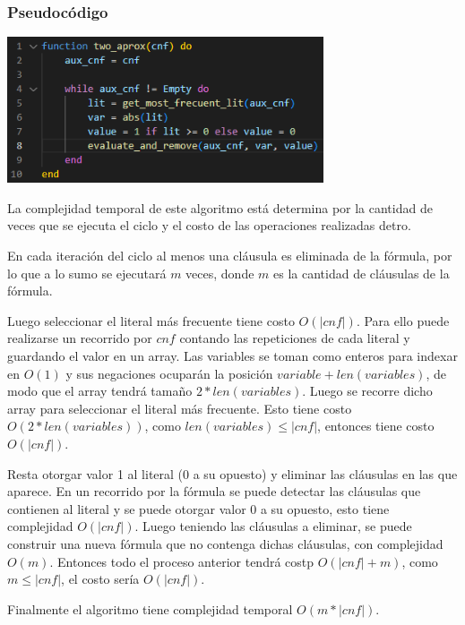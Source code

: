 \documentclass{article}
\begin{document}
        \subsubsection*{Pseudocódigo}
            \includegraphics[width = 0.7\textwidth]{resources/code5.png}

            La complejidad temporal de este algoritmo está determina por la cantidad 
            de veces que se ejecuta el ciclo y el costo de las operaciones realizadas
            detro. 
            
            En cada iteración del ciclo al menos una cláusula es eliminada de la fórmula,
            por lo que a lo sumo se ejecutará $m$ veces, donde $m$ es la cantidad de cláusulas
            de la fórmula.

            Luego seleccionar el literal más frecuente tiene costo $O(|cnf|)$. Para ello
            puede realizarse un recorrido por $cnf$ contando las repeticiones de cada literal y 
            guardando el valor en un array. Las variables se toman como enteros para indexar en $O(1)$ 
            y sus negaciones ocuparán la posición $variable + len(variables)$, de modo que 
            el array tendrá tamaño $2*len(variables)$.
            Luego se recorre dicho array para seleccionar el literal más frecuente. Esto tiene
            costo $O(2*len(variables))$, como $len(variables) \leq |cnf|$, entonces tiene costo $O(|cnf|)$.

            Resta otorgar valor 1 al literal (0 a su opuesto) y eliminar las cláusulas en las que aparece. 
            En un recorrido por la fórmula se puede detectar las cláusulas que contienen al literal y se puede otorgar
            valor 0 a su opuesto, esto tiene complejidad $O(|cnf|)$. 
            Luego teniendo las cláusulas a eliminar, se puede construir una nueva fórmula que no contenga 
            dichas cláusulas, con complejidad $O(m)$. Entonces todo el proceso anterior tendrá
            costp $O(|cnf| + m)$, como $m \leq |cnf|$, el costo sería $O(|cnf|)$.
            
            Finalmente el algoritmo tiene complejidad temporal $O(m*|cnf|)$. 
\end{document}
